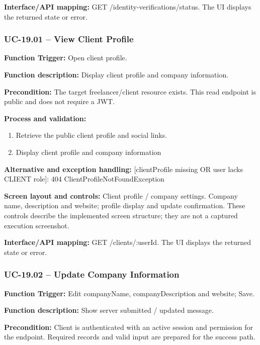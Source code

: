 \textbf{Interface/\allowbreak{}API mapping:} GET /\allowbreak{}identity-verifications/\allowbreak{}status. The UI displays the returned state or error.

\subsubsection{UC-19.01 -- View Client Profile}
\textbf{Function Trigger:} Open client profile.

\textbf{Function description:} Display client profile and company information.

\textbf{Precondition:} The target freelancer/\allowbreak{}client resource exists. This read endpoint is public and does not require a JWT.

\textbf{Process and validation:}
\begin{enumerate}
\item Retrieve the public client profile and social links.
\item Display client profile and company information
\end{enumerate}
\textbf{Alternative and exception handling:} [client\allowbreak{}Profile missing OR user lacks CLIENT role]: 404 Client\allowbreak{}Profile\allowbreak{}Not\allowbreak{}Found\allowbreak{}Exception

\textbf{Screen layout and controls:} Client profile /\allowbreak{} company settings. Company name, description and website; profile display and update confirmation. These controls describe the implemented screen structure; they are not a captured execution screenshot.

\textbf{Interface/\allowbreak{}API mapping:} GET /\allowbreak{}clients/\allowbreak{}:user\allowbreak{}Id. The UI displays the returned state or error.

\subsubsection{UC-19.02 -- Update Company Information}
\textbf{Function Trigger:} Edit company\allowbreak{}Name, company\allowbreak{}Description and website; Save.

\textbf{Function description:} Show server submitted /\allowbreak{} updated message.

\textbf{Precondition:} Client is authenticated with an active session and permission for the endpoint. Required records and valid input are prepared for the success path.

